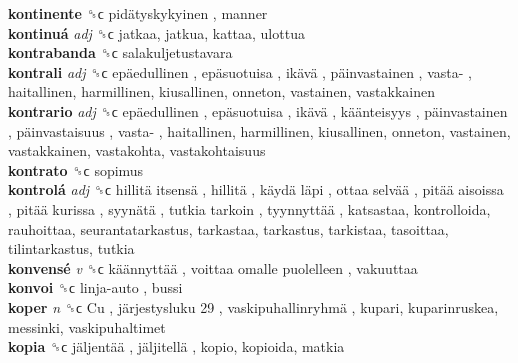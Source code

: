 \textbf{kontinente} ␝ϲ   pidätyskykyinen , manner  \\
\textbf{kontinuá} \emph{adj}  ␝ϲ  jatkaa, jatkua, kattaa, ulottua  \\
\textbf{kontrabanda} ␝ϲ  salakuljetustavara  \\
\textbf{kontrali} \emph{adj}  ␝ϲ   epäedullinen ,  epäsuotuisa ,  ikävä ,  päinvastainen ,  vasta- , haitallinen, harmillinen, kiusallinen, onneton, vastainen, vastakkainen  \\
\textbf{kontrario} \emph{adj}  ␝ϲ   epäedullinen ,  epäsuotuisa ,  ikävä ,  käänteisyys ,  päinvastainen ,  päinvastaisuus ,  vasta- , haitallinen, harmillinen, kiusallinen, onneton, vastainen, vastakkainen, vastakohta, vastakohtaisuus  \\
\textbf{kontrato} ␝ϲ  sopimus  \\
\textbf{kontrolá} \emph{adj}  ␝ϲ   hillitä itsensä ,  hillitä ,  käydä läpi ,  ottaa selvää ,  pitää aisoissa ,  pitää kurissa ,  syynätä ,  tutkia tarkoin ,  tyynnyttää , katsastaa, kontrolloida, rauhoittaa, seurantatarkastus, tarkastaa, tarkastus, tarkistaa, tasoittaa, tilintarkastus, tutkia  \\
\textbf{konvensé} \emph{v}  ␝ϲ   käännyttää ,  voittaa omalle puolelleen , vakuuttaa  \\
\textbf{konvoi} ␝ϲ   linja-auto , bussi  \\
\textbf{koper} \emph{n}  ␝ϲ   Cu ,  järjestysluku 29 ,  vaskipuhallinryhmä , kupari, kuparinruskea, messinki, vaskipuhaltimet  \\
\textbf{kopia} ␝ϲ   jäljentää ,  jäljitellä , kopio, kopioida, matkia  \\
